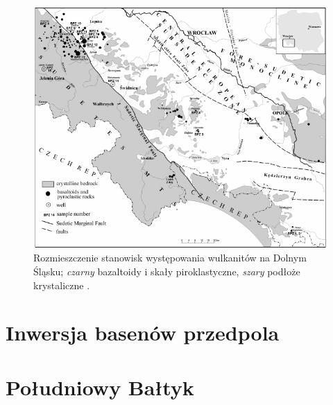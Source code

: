 \documentclass[11.5pt,twoside]{report}
\begin{document}
 \begin{figure}[h]
 	\centering
 	\includegraphics[width=0.7\linewidth]{../Termika/dslwulkanity}
 	\caption{Rozmieszczenie stanowisk występowania wulkanitów na Dolnym Śląsku; \textit{czarny} bazaltoidy i skały piroklastyczne, \textit{szary} podłoże krystaliczne \parencite{Badura.2005}.}
 	\label{badura}
 \end{figure}
 
 
 
 
 
 
 
  	\section{Inwersja basenów przedpola} 
  
  

  
  	\section{Południowy Bałtyk}
  	
  	
\end{document}
